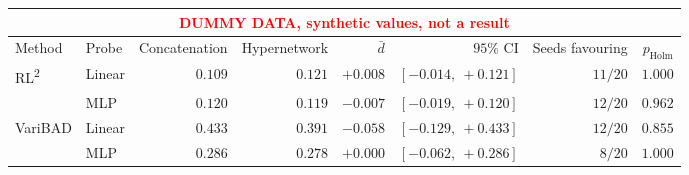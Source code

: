 \setlength{\tabcolsep}{4pt}
\begin{tabular}{llrrrrrr}
\toprule
\multicolumn{8}{c}{\textcolor{red}{\footnotesize DUMMY DATA, synthetic values, not a result}} \\
\hline
Method & Probe & Concatenation & Hypernetwork & $\bar{d}$ & $95\%$ CI & Seeds favouring & $p_{\text{Holm}}$ \\
\midrule
RL\textsuperscript{2} & Linear & $0.109$ & $0.121$ & $+0.008$ & $[-0.014,\ +0.121]$ & $11/20$ & $1.000$ \\
 & MLP & $0.120$ & $0.119$ & $-0.007$ & $[-0.019,\ +0.120]$ & $12/20$ & $0.962$ \\
\cmidrule(l){2-8}
VariBAD & Linear & $0.433$ & $0.391$ & $-0.058$ & $[-0.129,\ +0.433]$ & $12/20$ & $0.855$ \\
 & MLP & $0.286$ & $0.278$ & $+0.000$ & $[-0.062,\ +0.286]$ & $8/20$ & $1.000$ \\
\bottomrule
\end{tabular}
